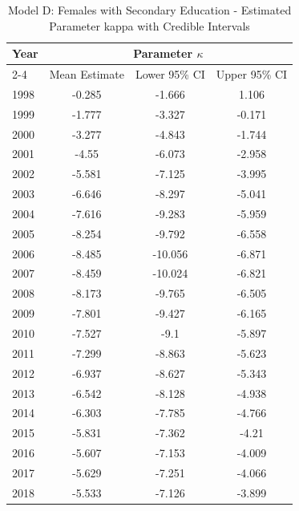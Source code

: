 \begin{landscape}
\begin{table}[htbp]
\centering
\caption{Model D: Females with Secondary Education - Estimated Parameter kappa  with Credible Intervals}
\label{tab:parameters_k27}
\begin{tabular}{@{}lccc@{}}
\toprule
Year & \multicolumn{3}{c}{Parameter \(\kappa\)} \\
\cmidrule(lr){2-4}
      & Mean Estimate & Lower 95\% CI & Upper 95\% CI \\
\midrule
1998 & -0.285 & -1.666 & 1.106 \\
1999 & -1.777 & -3.327 & -0.171 \\
2000 & -3.277 & -4.843 & -1.744 \\
2001 & -4.55 & -6.073 & -2.958 \\
2002 & -5.581 & -7.125 & -3.995 \\
2003 & -6.646 & -8.297 & -5.041 \\
2004 & -7.616 & -9.283 & -5.959 \\
2005 & -8.254 & -9.792 & -6.558 \\
2006 & -8.485 & -10.056 & -6.871 \\
2007 & -8.459 & -10.024 & -6.821 \\
2008 & -8.173 & -9.765 & -6.505 \\
2009 & -7.801 & -9.427 & -6.165 \\
2010 & -7.527 & -9.1 & -5.897 \\
2011 & -7.299 & -8.863 & -5.623 \\
2012 & -6.937 & -8.627 & -5.343 \\
2013 & -6.542 & -8.128 & -4.938 \\
2014 & -6.303 & -7.785 & -4.766 \\
2015 & -5.831 & -7.362 & -4.21 \\
2016 & -5.607 & -7.153 & -4.009 \\
2017 & -5.629 & -7.251 & -4.066 \\
2018 & -5.533 & -7.126 & -3.899 \\
\bottomrule
\end{tabular}
\end{table}
\end{landscape}